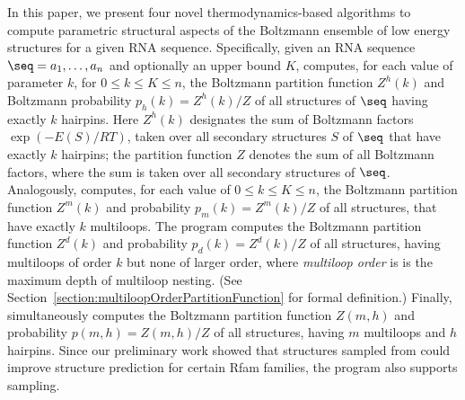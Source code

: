 In this paper, we present four novel
thermodynamics-based algorithms to compute parametric structural aspects of the
Boltzmann ensemble of low energy structures for a given RNA sequence.
Specifically, given an RNA sequence $\seq =a_1,\ldots,a_n$ and
optionally an upper bound $K$, {\rnahairpin} computes, for each value of
parameter $k$, for $0 \leq k \leq K \leq n$, the Boltzmann partition
function $Z^h(k)$ and
Boltzmann probability $p_h(k) = Z^h(k)/Z$ of all structures  of $\seq$ having
exactly $k$ hairpins. Here $Z^h(k)$ designates the sum of Boltzmann factors
$\exp(-E(S)/RT)$, taken over all
secondary structures $S$ of $\seq$ that have exactly $k$ hairpins; the
partition function $Z$ denotes the sum of all Boltzmann factors, where the
sum is taken over all secondary structures of $\seq$. Analogously,
{\rnamlnumber} computes, for each value of $0 \leq k \leq K \leq n$,
the Boltzmann partition function $Z^m(k)$ and probability
$p_m(k) = Z^m(k)/Z$ of all structures, that have exactly $k$
multiloops.
The program {\rnamlorder} computes the
Boltzmann partition function $Z^d(k)$ and probability
$p_d(k) = Z^d(k)/Z$ of all structures, having multiloops of order
$k$ but none of larger order, where {\em multiloop order} is
is the maximum depth of multiloop nesting.
(See Section~\ref{section:multiloopOrderPartitionFunction} for
formal definition.)
Finally, {\rnahairpinml} simultaneously computes the
Boltzmann partition function $Z(m,h)$ and probability
$p(m,h) = Z(m,h)/Z$ of all structures, having $m$ multiloops and
$h$ hairpins. Since our preliminary work showed that structures sampled
from {\rnahairpin} could improve structure prediction for certain Rfam
families, the program {\rnahairpinml} also supports sampling.

